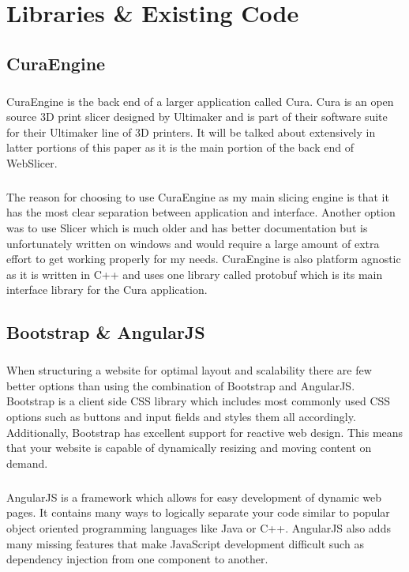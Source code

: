 \chapter{Libraries \& Existing Code}

\section{CuraEngine}
\paragraph{}
CuraEngine is the back end of a larger application called Cura.
Cura is an open source 3D print slicer designed by Ultimaker and is part of their software suite for their Ultimaker line of 3D printers.
It will be talked about extensively in latter portions of this paper as it is the main portion of the back end of WebSlicer.

\paragraph{}
The reason for choosing to use CuraEngine as my main slicing engine is that it has the most clear separation between application and interface.
Another option was to use Slicer which is much older and has better documentation but is unfortunately written on windows and would require a large amount of extra effort to get working properly for my needs.
CuraEngine is also platform agnostic as it is written in C++ and uses one library called protobuf which is its main interface library for the Cura application.

\section{Bootstrap \& AngularJS}
\paragraph{}
When structuring a website for optimal layout and scalability there are few better options than using the combination of Bootstrap and AngularJS.
Bootstrap is a client side CSS library which includes most commonly used CSS options such as buttons and input fields and styles them all accordingly.
Additionally, Bootstrap has excellent support for reactive web design.
This means that your website is capable of dynamically resizing and moving content on demand.
\paragraph{}
AngularJS is a framework which allows for easy development of dynamic web pages.
It contains many ways to logically separate your code similar to popular object oriented programming languages like Java or C++.
AngularJS also adds many missing features that make JavaScript development difficult such as dependency injection from one component to another.


